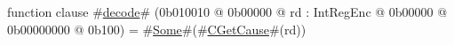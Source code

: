 function clause #\hyperref[zdecode]{decode}# (0b010010 @ 0b00000 @ rd : IntRegEnc @    0b00000 @ 0b00000000 @ 0b100) = #\hyperref[zSome]{Some}#(#\hyperref[zCGetCause]{CGetCause}#(rd))
